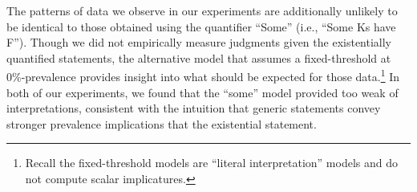 \documentclass[floatsintext,doc]{apa6}
\let\rmarkdownfootnote\footnote%
\def\footnote{\protect\rmarkdownfootnote}
\begin{document}

The patterns of data we observe in our experiments are additionally unlikely to be identical to those obtained using the quantifier \enquote{Some} (i.e., \enquote{Some Ks have F}).
Though we did not empirically measure judgments given the existentially quantified statements, the alternative model that assumes a fixed-threshold at 0\%-prevalence provides insight into what should be expected for those data.\footnote{Recall the fixed-threshold models are \enquote{literal interpretation} models and do not compute scalar implicatures.}
In both of our experiments, we found that the \enquote{some} model provided too weak of interpretations, consistent with the intuition that generic statements convey stronger prevalence implications that the existential statement.
\end{document}
